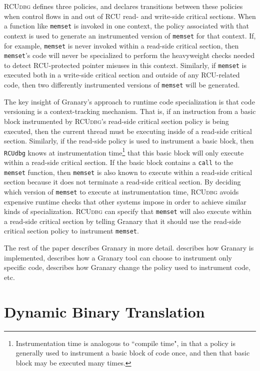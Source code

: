\documentclass[preprint]{sigplanconf}
\newcommand{\toolname}[1]{{\scshape #1}}
\begin{document}
\toolname{RCUdbg} defines three policies, and declares transitions between these policies when control flows in and out of RCU read- and write-side critical sections. When a function like \texttt{memset} is invoked in one context, the policy associated with that context is used to generate an instrumented version of \texttt{memset} for that context. If, for example, \texttt{memset} is never invoked within a read-side critical section, then \texttt{memset}'s code will never be specialized to perform the heavyweight checks needed to detect RCU-protected pointer misuses in this context. Similarly, if \texttt{memset} is executed both in a write-side critical section and outside of any RCU-related code, then two differently instrumented versions of \texttt{memset} will be generated.

The key insight of Granary's approach to runtime code specialization is that code versioning is a context-tracking mechanism. That is, if an instruction from a basic block instrumented by \toolname{RCUdbg}'s read-side critical section policy is being executed, then the current thread must be executing inside of a read-side critical section. Similarly, if the read-side policy is used to instrument a basic block, then \texttt{RCUdbg} knows at instrumentation time\footnote{Instrumentation time is analogous to ``compile time", in that a policy is generally used to instrument a basic block of code once, and then that basic block may be executed many times.} that this basic block will only execute within a read-side critical section. If the basic block contains a \texttt{call} to the \texttt{memset} function, then \texttt{memset} is also known to execute within a read-side critical section because it does not terminate a read-side critical section. By deciding which version of \texttt{memset} to execute at instrumentation time, \toolname{RCUdbg} avoids expensive runtime checks that other systems impose in order to achieve similar kinds of specialization. \toolname{RCUdbg} can specify that \texttt{memset} will also execute within a read-side critical section by telling Granary that it should use the read-side critical section policy to instrument \texttt{memset}. 

The rest of the paper describes Granary in more detail.  describes how Granary is implemented,  describes how a Granary tool can choose to instrument only specific code,  describes how Granary change the policy used to instrument code, etc.

\section{Dynamic Binary Translation}\label{sec:dbt}
\end{document}
